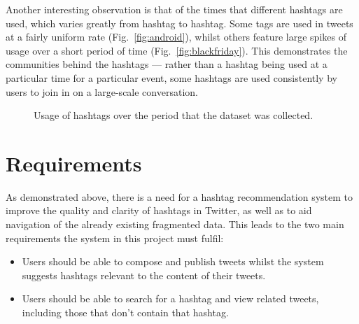 \documentclass[11pt,a4paper]{report}
\begin{document}
Another interesting observation is that of the times that different hashtags are used, which varies greatly from hashtag to hashtag. Some tags are used in tweets at a fairly uniform rate (Fig.~\ref{fig:android}), whilst others feature large spikes of usage over a short period of time (Fig.~\ref{fig:blackfriday}). This demonstrates the communities behind the hashtags --- rather than a hashtag being used at a particular time for a particular event, some hashtags are used consistently by users to join in on a large-scale conversation.

\begin{figure}[htpb]
    \centering
    \caption{Usage of hashtags over the period that the dataset was collected.}
\end{figure}

\section{Requirements}

As demonstrated above, there is a need for a hashtag recommendation system to improve the quality and clarity of hashtags in Twitter, as well as to aid navigation of the already existing fragmented data. This leads to the two main requirements the system in this project must fulfil:
\begin{itemize}
    \item Users should be able to compose and publish tweets whilst the system suggests hashtags relevant to the content of their tweets.
    \item Users should be able to search for a hashtag and view related tweets, including those that don't contain that hashtag.
\end{itemize}
\end{document}

